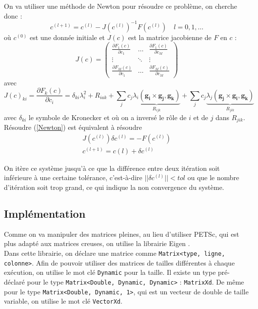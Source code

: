 On va utiliser une méthode de Newton pour résoudre ce problème, on cherche donc :
\begin{equation}\label{Newton}
c^{(l+1)} = c^{(l)} - J(c^{(l)})^{-1}F(c^{(l)})\quad l=0,1,\ldots
\end{equation}
où $c^{(0)}$ est une donnée initiale et $J(c)$ est la matrice jacobienne de $F$ en $c$ :
\[ J(c)=
\begin{pmatrix}
\frac{\partial F_1(c)}{\partial c_1} & \ldots & \frac{\partial F_1(c)}{\partial c_M}\\
\vdots & \ddots & \vdots\\
\frac{\partial F_M(c)}{\partial c_1} & \ldots & \frac{\partial F_M(c)}{\partial c_M}
\end{pmatrix}\]
avec 
\begin{equation}\label{psj}
J(c)_{ki} = \frac{\partial F_k(c)}{\partial c_i} = \delta_{ki}\lambda_i^2 + R_{iak} + \sum_j c_j \underbrace{\lambda_i(\mathbf{g_i}\times\mathbf{g_j},\mathbf{g_k})}_{R_{ijk}} + \sum_j c_j\underbrace{\lambda_j (\mathbf{g_j}\times\mathbf{g_i},\mathbf{g_k})}_{R_{jik}}
\end{equation}
avec $\delta_{ki}$ le symbole de Kronecker et où on a inversé le rôle de $i$ et de $j$ dans $R_{jik}$.\\

Résoudre (\ref{Newton}) est équivalent à résoudre 
\begin{align}
J(c^{(l)})\delta c^{(l)} = -F(c^{(l)})\label{INewton1}\\
c^{(l+1)}=c{(l)}+\delta c^{(l)}\nonumber
\end{align}

On itère ce système jusqu'à ce que la différence entre deux itération soit inférieure à une certaine tolérance, c'est-à-dire $||\delta c^{(l)}||<tol$ ou que le nombre d'itération soit trop grand, ce qui indique la non convergence du système.

\subsection{Implémentation}
Comme on va manipuler des matrices pleines, au lieu d'utiliser PETSc, qui est plus adapté aux matrices creuses, on utilise la librairie Eigen \cite{eigenweb}.\\
Dans cette librairie, on déclare une matrice comme \texttt{Matrix<type, ligne, colonne>}. Afin de pouvoir utiliser des matrices de tailles différentes à chaque exécution, on utilise le mot clé \texttt{Dynamic} pour la taille. Il existe un type pré-déclaré pour le type \texttt{Matrix<Double, Dynamic, Dynamic>} : \texttt{MatrixXd}. De même pour le type \texttt{Matrix<Double, Dynamic, 1>}, qui est un vecteur de double de taille variable, on utilise le mot clé \texttt{VectorXd}.\\

